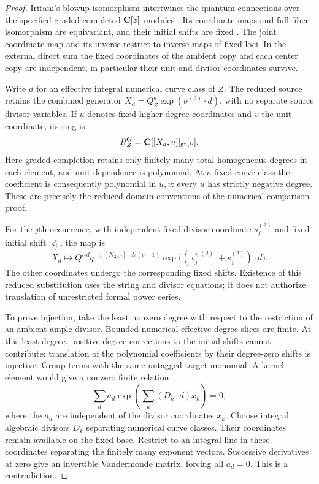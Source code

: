 \begin{proof}
Iritani's blowup isomorphism intertwines the quantum connections over the
specified graded completed $\mathbf C[z]$-modules
\cite[Theorem~5.18 and Section~5.8.2]{IritaniBlowup}. Its coordinate maps and full-fiber
isomorphism are equivariant, and their initial shifts are fixed
\cite[Proposition~8 and Lemma~10]{IritaniHodge}. The joint coordinate map and its
inverse restrict to inverse maps of fixed loci. In the external direct
sum the fixed coordinates of the ambient copy and each center copy are
independent; in particular their unit and divisor coordinates survive.

Write $d$ for an effective integral numerical curve class of $Z$. The
reduced source retains the combined generator
$X_d=Q_Z^d\exp(\sigma^{(2)}\cdot d)$, with no separate source divisor
variables. If $u$ denotes fixed higher-degree coordinates and $v$ the unit
coordinate, its ring is
\[
 R_Z^G=\mathbf C[[X_d,u]]_{\mathrm{gr}}[v].
\]
Here graded completion retains only finitely many total homogeneous
degrees in each element, and unit dependence is polynomial. At a fixed
curve class the coefficient is consequently polynomial in $u,v$: every
$u$ has strictly negative degree. These are precisely the reduced-domain
conventions of the numerical comparison proof.

For the $j$th occurrence, with independent fixed divisor coordinate
$s_j^{(2)}$ and fixed initial shift $\varsigma_j^\circ$, the map is
\[
 X_d\longmapsto Q^{i_*d}
 q^{-c_1(N_{Z/T})\cdot d/(c-1)}
 \exp\bigl((\varsigma_j^{\circ,(2)}+s_j^{(2)})\cdot d\bigr).
\]
The other coordinates undergo the corresponding fixed shifts. Existence
of this reduced substitution uses the string and divisor equations; it
does not authorize translation of unrestricted formal power series.

To prove injection, take the least nonzero degree with respect to the
restriction of an ambient ample divisor. Bounded numerical effective-degree
slices are finite. At this least degree, positive-degree corrections to
the initial shifts cannot contribute; translation of the polynomial
coefficients by their degree-zero shifts is injective. Group terms with
the same untagged target monomial. A kernel element would give a nonzero
finite relation
\[
 \sum_d a_d\exp\!\left(\sum_k(D_k\cdot d)x_k\right)=0,
\]
where the $a_d$ are independent of the divisor coordinates $x_k$.
Choose integral algebraic divisors $D_k$ separating numerical curve
classes. Their coordinates remain available on the fixed base. Restrict
to an integral line in these coordinates separating the finitely many
exponent vectors. Successive derivatives at zero give an invertible
Vandermonde matrix, forcing all $a_d=0$. This is a contradiction.


\end{proof}
